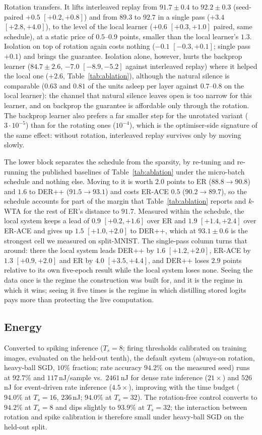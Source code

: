 \documentclass{article}
\newcommand{\kwta}{$k$-WTA}
\begin{document}
Rotation transfers. It lifts interleaved replay from $91.7\pm0.4$ to $92.2\pm0.3$
(seed-paired $+0.5$ $[+0.2,+0.8]$) and from $89.3$ to $92.7$ in a single pass ($+3.4$
$[+2.8,+4.0]$), to the level of the local learner ($+0.6$ $[+0.3,+1.0]$ paired, same
schedule), at a static price of $0.5$--$0.9$
points, smaller than the local learner's $1.3$. Isolation on top of rotation again costs
nothing ($-0.1$ $[-0.3,+0.1]$;
single pass $+0.1$) and brings the guarantee. Isolation alone, however, hurts the backprop
learner ($84.7\pm2.6$, $-7.0$ $[-8.9,-5.2]$ against interleaved replay) where it helped the
local one ($+2.6$, Table~\ref{tab:ablation}), although the natural silence is comparable
($0.63$ and $0.81$ of the units asleep per layer against $0.7$--$0.8$ on the local
learner): the channel that natural silence leaves open is too narrow for this learner, and
on backprop the guarantee is affordable only through the rotation. The backprop learner also
prefers a far smaller step for the unrotated variant ($3{\cdot}10^{-5}$) than for the
rotating ones ($10^{-4}$), which is the optimiser-side signature of the same effect: without
rotation, interleaved replay survives only by moving slowly.

The lower block separates the schedule from the sparsity, by re-tuning and re-running the
published baselines of Table~\ref{tab:ablation} under the micro-batch schedule and nothing
else. Moving to it is worth $2.0$ points to ER ($88.8\to90.8$) and $1.6$ to DER++
($91.5\to93.1$) and costs ER-ACE $0.5$ ($90.2\to89.7$), so the schedule accounts for part of
the margin that Table~\ref{tab:ablation} reports and \kwta{} for the rest of ER's distance
to $91.7$. Measured within the schedule, the local system keeps a lead of $0.9$
$[+0.2,+1.6]$ over ER and $1.9$ $[+1.4,+2.4]$ over ER-ACE and gives up $1.5$
$[+1.0,+2.0]$ to DER++, which at $93.1\pm0.6$ is the strongest cell we measured on
split-MNIST. The single-pass column turns that around: there the local system leads DER++ by
$1.6$ $[+1.2,+2.0]$, ER-ACE by $1.3$ $[+0.9,+2.0]$ and ER by $4.0$ $[+3.5,+4.4]$, and DER++
loses $2.9$ points relative to its own five-epoch result while the local system loses none.
Seeing the data once is the regime the construction was built for, and it is the regime in
which it wins; seeing it five times is the regime in which distilling stored logits pays
more than protecting the live computation.

\subsection{Energy}
Converted to spiking inference ($T_s{=}8$; firing thresholds calibrated on training images,
evaluated on the held-out tenth), the default system (always-on rotation, heavy-ball SGD,
$10\%$ fraction; rate accuracy $94.2\%$ on the measured seed) runs at $92.7\%$ and
$117$\,nJ/sample vs.\ $2461$\,nJ for dense rate inference ($21\times$) and $526$\,nJ for
event-driven rate inference ($4.5\times$), improving with the time budget ($94.0\%$ at
$T_s{=}16$, $236$\,nJ; $94.0\%$ at $T_s{=}32$). The rotation-free control converts to
$94.2\%$ at $T_s{=}8$ and dips slightly to $93.9\%$ at $T_s{=}32$; the interaction between
rotation and spike calibration is therefore small under heavy-ball SGD on the held-out
split.
\end{document}
